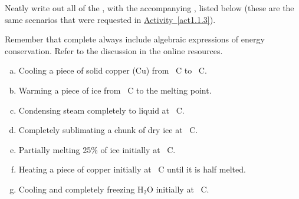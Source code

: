 \label{fnt1.1.3-1}

Neatly write out all of the \EnergyDiagrams{}, with the accompanying \TempGraphs{}, listed below (these are the same scenarios that were requested in \hyperref[act1.1.3]{Activity~\ref*{act1.1.3}}).

Remember that complete \EnergyDiagrams{} always include algebraic expressions of energy conservation. Refer to the \EnergyInteractionModel{} discussion in the online resources.

\begin{enumerate}[(a)]
	\item Cooling a piece of solid copper (Cu) from \unit[500]{\textdegree C} to \unit[350]{\textdegree C}.
	\item Warming a piece of ice from \unit[-20]{\textdegree C} to the melting point.
	\item Condensing steam completely to liquid at \unit[100]{\textdegree C}.
	\item Completely sublimating a chunk of dry ice at \unit[-79]{\textdegree C}.
	\item Partially melting 25\% of ice initially at \unit[0]{\textdegree C}.
	\item Heating a piece of copper initially at \unit[300]{\textdegree C} until it is half melted.
	\item Cooling and completely freezing H$_2$O initially at \unit[80]{\textdegree C}.
\end{enumerate}

